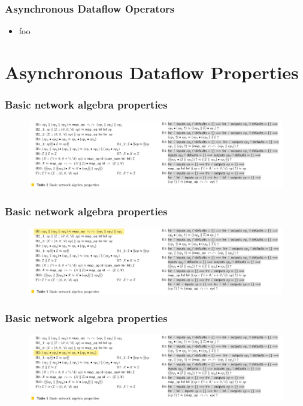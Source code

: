\documentclass[fleqn,aspectratio=169,10pt]{beamer}
\begin{document}
\begin{frame}[fragile]
  \frametitle{Asynchronous Dataflow Operators}
  \begin{itemize}
    \item foo
  \end{itemize}
\end{frame}

\section{Asynchronous Dataflow Properties}
\begin{frame}[fragile]
  \frametitle{Basic network algebra properties}
  \begin{figure}
    \centering
    \includegraphics[width=1\textwidth]{table_1.png}
  \end{figure}
\end{frame}

\begin{frame}
  \frametitle{Basic network algebra properties}
  \begin{figure}
    \centering
    \includegraphics[width=1\textwidth]{table_1_1.png}
  \end{figure}
\end{frame}

\begin{frame}
  \frametitle{Basic network algebra properties}
  \begin{figure}
    \centering
    \includegraphics[width=1\textwidth]{table_1_2.png}
  \end{figure}
\end{frame}
\end{document}
